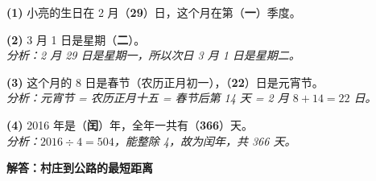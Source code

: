 {\small
\textbf{(1)} 小亮的生日在 2 月（\textbf{29}）日，这个月在第（\textbf{一}）季度。

\vspace{0.3cm}
\textbf{(2)} 3 月 1 日是星期（\textbf{二}）。\\
\textit{分析：2 月 29 日是星期一，所以次日 3 月 1 日是星期二。}

\vspace{0.3cm}
\textbf{(3)} 这个月的 8 日是春节（农历正月初一），（\textbf{22}）日是元宵节。\\
\textit{分析：元宵节 = 农历正月十五 = 春节后第 14 天 = 2 月 $8 + 14 = 22$ 日。}

\vspace{0.3cm}
\textbf{(4)} 2016 年是（\textbf{闰}）年，全年一共有（\textbf{366}）天。\\
\textit{分析：$2016 \div 4 = 504$，能整除 4，故为闰年，共 366 天。}
}




\newpage

\begin{center}
  {\large\bfseries 解答：村庄到公路的最短距离}
\end{center}

\vspace{0.6cm}


\vspace{1.0cm}

